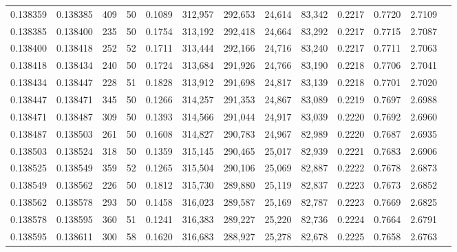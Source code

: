 \begin{tabular}{rrrrrrrrrrrrr}
0.138359 & 0.138385 &   409 &  50 &                                     0.1089 & 312,957 & 292,653 &  24,614 &  83,342 & 0.2217 & 0.7720 & 2.7109 \\
0.138385 & 0.138400 &   235 &  50 &                                     0.1754 & 313,192 & 292,418 &  24,664 &  83,292 & 0.2217 & 0.7715 & 2.7087 \\
0.138400 & 0.138418 &   252 &  52 &                                     0.1711 & 313,444 & 292,166 &  24,716 &  83,240 & 0.2217 & 0.7711 & 2.7063 \\
0.138418 & 0.138434 &   240 &  50 &                                     0.1724 & 313,684 & 291,926 &  24,766 &  83,190 & 0.2218 & 0.7706 & 2.7041 \\
0.138434 & 0.138447 &   228 &  51 &                                     0.1828 & 313,912 & 291,698 &  24,817 &  83,139 & 0.2218 & 0.7701 & 2.7020 \\
0.138447 & 0.138471 &   345 &  50 &                                     0.1266 & 314,257 & 291,353 &  24,867 &  83,089 & 0.2219 & 0.7697 & 2.6988 \\
0.138471 & 0.138487 &   309 &  50 &                                     0.1393 & 314,566 & 291,044 &  24,917 &  83,039 & 0.2220 & 0.7692 & 2.6960 \\
0.138487 & 0.138503 &   261 &  50 &                                     0.1608 & 314,827 & 290,783 &  24,967 &  82,989 & 0.2220 & 0.7687 & 2.6935 \\
0.138503 & 0.138524 &   318 &  50 &                                     0.1359 & 315,145 & 290,465 &  25,017 &  82,939 & 0.2221 & 0.7683 & 2.6906 \\
0.138525 & 0.138549 &   359 &  52 &                                     0.1265 & 315,504 & 290,106 &  25,069 &  82,887 & 0.2222 & 0.7678 & 2.6873 \\
0.138549 & 0.138562 &   226 &  50 &                                     0.1812 & 315,730 & 289,880 &  25,119 &  82,837 & 0.2223 & 0.7673 & 2.6852 \\
0.138562 & 0.138578 &   293 &  50 &                                     0.1458 & 316,023 & 289,587 &  25,169 &  82,787 & 0.2223 & 0.7669 & 2.6825 \\
0.138578 & 0.138595 &   360 &  51 &                                     0.1241 & 316,383 & 289,227 &  25,220 &  82,736 & 0.2224 & 0.7664 & 2.6791 \\
0.138595 & 0.138611 &   300 &  58 &                                     0.1620 & 316,683 & 288,927 &  25,278 &  82,678 & 0.2225 & 0.7658 & 2.6763 \\

\end{tabular}
